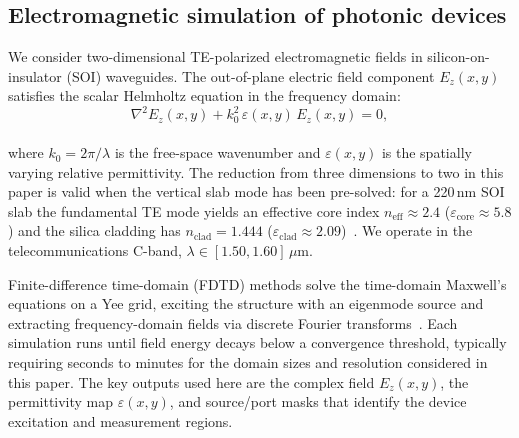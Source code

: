 \documentclass[%
 reprint,
 amsmath,amssymb,
 aps,
floatfix,
]{revtex4-2}
\begin{document}
\subsection{Electromagnetic simulation of photonic devices}
We consider two-dimensional TE-polarized electromagnetic fields in silicon-on-insulator (SOI) waveguides. The out-of-plane electric field component $E_z(x,y)$ satisfies the scalar Helmholtz equation in the frequency domain:
\begin{equation}
    \nabla^2 E_z(x,y) + k_0^2 \,\varepsilon(x,y)\, E_z(x,y) = 0,
    \label{eq:helmholtz}
\end{equation}
\\
where $k_0=2\pi/\lambda$ is the free-space wavenumber and $\varepsilon(x,y)$ is the spatially varying relative permittivity. The reduction from three dimensions to two in this paper is valid when the vertical slab mode has been pre-solved: for a 220\,nm SOI slab the fundamental TE mode yields an effective core index $n_\text{eff}\approx 2.4$
($\varepsilon_\text{core}\approx 5.8$) and the silica cladding has $n_\text{clad}=1.444$ ($\varepsilon_\text{clad}\approx 2.09$)~\cite{ReedKnights2004SiliconPhotonics}. We operate in the telecommunications C-band,
$\lambda\in[1.50,1.60]\,\mu$m.

Finite-difference time-domain (FDTD) methods solve the time-domain Maxwell's equations on a Yee grid, exciting the structure with an eigenmode source and extracting frequency-domain fields via discrete Fourier transforms~\cite{TafloveHagness2005FDTD}. Each simulation runs until field energy decays below a convergence threshold, typically requiring seconds to minutes for the domain sizes and resolution considered in this paper. The key outputs used here are the complex field $E_z(x,y)$, the permittivity map $\varepsilon(x,y)$, and source/port masks that identify the device excitation and measurement regions.
\end{document}
